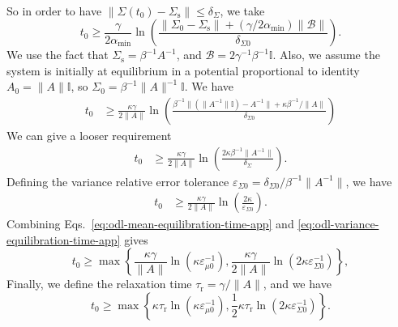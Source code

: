 \documentclass[prx,onecolumn,floatfix,longbibliography,notitlepage, nofootinbib]{revtex4-1}
\renewcommand{\geq}{\geqslant}
\renewcommand{\leq}{\leqslant}
\begin{document}
\begin{appendix}
\begin{align}
\end{align} 
So in order to have $\|\Sigma(t_0) - \Sigma_\text{s}\| \leq \delta_
\Sigma$, we take
\begin{equation}
    t_0   \geq  \frac{\gamma}{2 \alpha_\text{min}}\ln\left(\frac{\|\Sigma_0 - \Sigma_\text{s}\| + (\gamma / 2\alpha_\text{min})\|\mathcal{B}\|}{\delta_{\Sigma 0}}\right).
\end{equation}
We use the fact that $\Sigma_\text{s} = \beta^{-1} A^{-1}$, and $\mathcal{B} = 2 \gamma^{-1} \beta^{-1} \mathbb{I}$. Also, we assume the system is initially at equilibrium in a potential proportional to identity $A_0 = \|A\|\mathbb{I}$, so $\Sigma_0 = \beta^{-1} \|A\|^{-1}\mathbb{I}$. We have
\begin{align}
    t_0   &\geq  \frac{\kappa\gamma}{2 \|A\|}\ln\left(\frac{\beta^{-1}\|(\|A^{-1}\|\mathbb{I}) - A^{-1}\| + \kappa \beta^{-1}/\|A\|}{\delta_{\Sigma 0}}\right)
\end{align}
We can give a looser requirement
\begin{align}
    t_0   &\geq  \frac{\kappa\gamma}{2\|A\| }\ln\left(\frac{2\kappa\beta^{-1}\|A^{-1}\|}{\delta_\Sigma }\right).
\end{align}
Defining the variance relative error tolerance $\varepsilon_{\Sigma 0} = \delta_{\Sigma 0}/\beta^{-1} \|A^{-1}\|$, we have
\begin{align}
\label{eq:odl-variance-equilibration-time-app}
    t_0   &\geq  \frac{\kappa\gamma}{2 \|A\|}\ln\left(\frac{2\kappa}{\varepsilon_{\Sigma 0}}\right).
\end{align}
Combining Eqs.~\eqref{eq:odl-mean-equilibration-time-app} and \eqref{eq:odl-variance-equilibration-time-app} gives 
\begin{equation}
t_0 \geq \max \left\{\frac{\kappa \gamma}{\|A\|} \ln \left(\kappa \varepsilon^{-1}_{\mu 0}\right),\frac{\kappa\gamma}{2\|A\| }\ln\left(2\kappa\varepsilon_{\Sigma 0}^{-1}\right)\right\},
\end{equation}
Finally, we define the relaxation time $\tau_\text{r} = \gamma/\|A\|$, and we have
\begin{equation}
t_0 \geq \max \left\{\kappa \tau_\text{r}\ln \left(\kappa \varepsilon^{-1}_{\mu 0}\right),\frac{1}{2} \kappa \tau_\text{r}\ln\left(2\kappa\varepsilon_{\Sigma 0}^{-1}\right)\right\}.
\end{equation}


\end{appendix}
\end{document}
